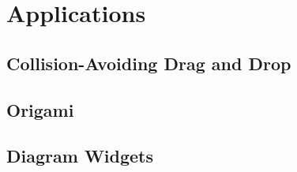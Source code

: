 \chapter{Applications}

\section{Collision-Avoiding Drag and Drop}

\section{Origami}

\section{Diagram Widgets}


